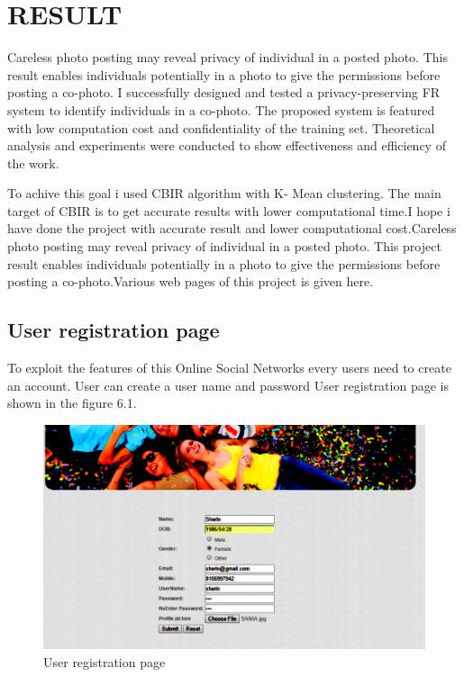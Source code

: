 \section[Result]{\fontsize{14}{12}\selectfont RESULT}
\noindent
Careless photo posting may reveal privacy of individual in a posted photo. This result enables individuals potentially in a photo to give the permissions before posting a co-photo. I successfully  designed   and tested a privacy-preserving FR system to identify individuals in a co-photo. The proposed system is featured with low computation cost and confidentiality of the training set. Theoretical analysis and experiments were conducted to show effectiveness and efficiency of the work.

  \vspace*{1pc}
To achive this goal i used CBIR algorithm with K- Mean clustering. The main target of CBIR is to get accurate results with lower computational time.I hope i have done the project with accurate result and lower computational cost.Careless photo posting may reveal privacy of individual in a posted photo. This project result enables individuals potentially in a photo to give the permissions before posting a co-photo.Various web pages of this project is given here.
\clearpage
\subsection[User Registration Page]{User registration page}
To exploit the features of this Online Social Networks every users  need to create an account. User can create a user name and password  User registration page is shown in the figure 6.1.
\vspace{1cm} 
\vspace{1cm}
\vspace{1cm}

 \begin{figure}[H]
\begin{minipage}[c]{1\linewidth}
\begin{center}
 \includegraphics[width=\textwidth]{rej.png}
        \caption[User Registration Page]{User registration page}
        \label{Login page}
\end{center}
\end{minipage}  
      \end{figure} 
 \noindent
 \clearpage
